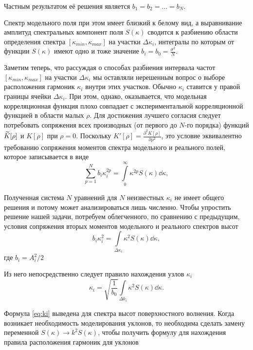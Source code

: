 Частным результатом её решения является $b_1 = b_2 = \dots = b_N$.

Спектр модельного поля при этом имеет близкий к белому вид, а выравнивание
амплитуд спектральных компонент поля $S(\kappa)$ сводится к разбиению области
определения спектра $[\kappa_{min},\kappa_{max}]$ на участки $\Delta
\kappa_i$, интегралы по
которым от функции  $S(\kappa)$ имеют одно и тоже значение $b_i = b_{0} =
\frac{\sigma^2}{N}$.

Заметим теперь, что рассуждая о способах разбиения интервала частот
$[\kappa_{min},
\kappa_{max}]$ на участки $\Delta \kappa_i$ мы оставляли нерешенным вопрос о выборе
расположения гармоник $\kappa_i$ внутри этих участков. Обычно  $\kappa_i$ ставится у
правой границы ячейки  $\Delta \kappa_i$. При этом, однако, оказывается, что
модельная корреляционная функция плохо совпадает с экспериментальной
корреляционной функцией в области малых  $\rho$. Для достижения лучшего
согласия следует потребовать сопряжения всех производных (от первого до $N$-го
порядка) функций $\widetilde K[\rho]$ и  $K[\rho]$ при  $\rho=0$. 
Поскольку $K'[\rho] = \frac{\partial^2 K[\rho]}{\partial \rho^2}$, это условие эквивалентно
требованию сопряжения моментов спектра модельного и реального полей, которое
записывается в виде
 \begin{equation}
    \sum\limits_{p=1}^{N} b_i \kappa_i^{2p} 
    = \int\limits_{0}^{\infty} \kappa^{2p}S(\kappa) \dd \kappa, 
\end{equation}

Полученная система $N$ уравнений для $N$ неизвестных $\kappa_i$ не имеет общего
решения и потому может анализироваться лишь численно. Чтобы упростить решение
нашей задачи, потребуем облегченного, по сравнению с предыдущим, условия
сопряжения вторых моментов модельного и реального спектров высот
 \begin{equation}
    b_i \kappa_i^2 = \int\limits_{\Delta \kappa_i} \kappa^2 S(\kappa) \dd \kappa,
\end{equation}
где $b_i= A_i^2 / 2$

Из него непосредственно следует правило нахождения узлов $\kappa_i$ 
\begin{equation}
    \label{eq:ki}
    {
        \kappa_i = \sqrt{\frac{1}{b_0}} \int\limits_{\Delta k_i} \kappa^2
        S(\kappa) \dd \kappa. 
    }
\end{equation}

Формула \eqref{eq:ki} выведена для спектра высот поверхностного волнения. Когда
возникает необходимость моделирования уклонов, то необходима сделать замену
переменной $S(\kappa) \to k^2 S(\kappa)$, чтобы получить формулу для нахождения правила
расположения гармоник для уклонов


